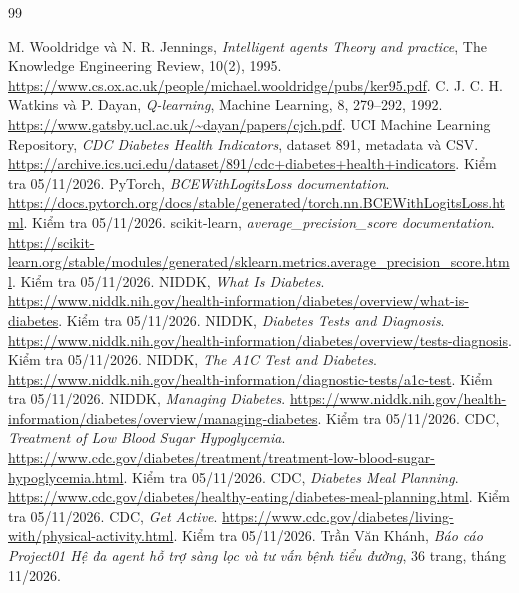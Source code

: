 \begin{thebibliography}{99}
 M. Wooldridge và N. R. Jennings, \textit{Intelligent agents Theory and practice}, The Knowledge Engineering Review, 10(2), 1995. \url{https://www.cs.ox.ac.uk/people/michael.wooldridge/pubs/ker95.pdf}.
 C. J. C. H. Watkins và P. Dayan, \textit{Q-learning}, Machine Learning, 8, 279--292, 1992. \url{https://www.gatsby.ucl.ac.uk/~dayan/papers/cjch.pdf}.
 UCI Machine Learning Repository, \textit{CDC Diabetes Health Indicators}, dataset 891, metadata và CSV. \url{https://archive.ics.uci.edu/dataset/891/cdc+diabetes+health+indicators}. Kiểm tra 05/11/2026.
 PyTorch, \textit{BCEWithLogitsLoss documentation}. \url{https://docs.pytorch.org/docs/stable/generated/torch.nn.BCEWithLogitsLoss.html}. Kiểm tra 05/11/2026.
 scikit-learn, \textit{average\_precision\_score documentation}. \url{https://scikit-learn.org/stable/modules/generated/sklearn.metrics.average_precision_score.html}. Kiểm tra 05/11/2026.
 NIDDK, \textit{What Is Diabetes}. \url{https://www.niddk.nih.gov/health-information/diabetes/overview/what-is-diabetes}. Kiểm tra 05/11/2026.
 NIDDK, \textit{Diabetes Tests and Diagnosis}. \url{https://www.niddk.nih.gov/health-information/diabetes/overview/tests-diagnosis}. Kiểm tra 05/11/2026.
 NIDDK, \textit{The A1C Test and Diabetes}. \url{https://www.niddk.nih.gov/health-information/diagnostic-tests/a1c-test}. Kiểm tra 05/11/2026.
 NIDDK, \textit{Managing Diabetes}. \url{https://www.niddk.nih.gov/health-information/diabetes/overview/managing-diabetes}. Kiểm tra 05/11/2026.
 CDC, \textit{Treatment of Low Blood Sugar Hypoglycemia}. \url{https://www.cdc.gov/diabetes/treatment/treatment-low-blood-sugar-hypoglycemia.html}. Kiểm tra 05/11/2026.
 CDC, \textit{Diabetes Meal Planning}. \url{https://www.cdc.gov/diabetes/healthy-eating/diabetes-meal-planning.html}. Kiểm tra 05/11/2026.
 CDC, \textit{Get Active}. \url{https://www.cdc.gov/diabetes/living-with/physical-activity.html}. Kiểm tra 05/11/2026.
 Trần Văn Khánh, \textit{Báo cáo Project01 Hệ đa agent hỗ trợ sàng lọc và tư vấn bệnh tiểu đường}, 36 trang, tháng 11/2026.
\end{thebibliography}
